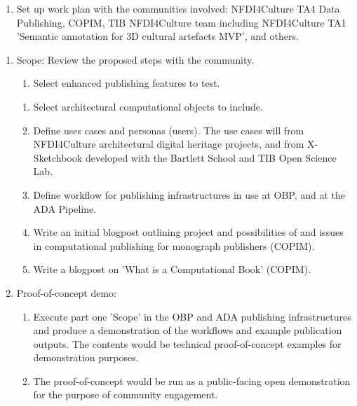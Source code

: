 \documentclass{article}
\begin{document}
\begin{enumerate}
\item Set up work plan with the communities involved: NFDI4Culture TA4 Data Publishing, COPIM, TIB NFDI4Culture team including NFDI4Culture TA1 'Semantic annotation for 3D cultural artefacts MVP', and others.


\end{enumerate}
\begin{enumerate}[start=2]
\item Scope: Review the proposed steps with the community.

\begin{enumerate}
\item Select enhanced publishing features to test.


\end{enumerate}
\begin{enumerate}[start=2]
\item Select architectural computational objects to include.


\item Define uses cases and personas (users). The use cases will from NFDI4Culture architectural digital heritage projects, and from X-Sketchbook developed with the Bartlett School and TIB Open Science Lab.   


\item Define workflow for publishing infrastructures in use at OBP, and at the ADA Pipeline.


\item Write an initial blogpost outlining project and possibilities of and issues in computational publishing for monograph publishers (COPIM).


\item Write a blogpost on 'What is a Computational Book' (COPIM).


\end{enumerate}

\item Proof-of-concept demo:

\begin{enumerate}
\item Execute part one 'Scope' in the OBP and ADA publishing infrastructures and produce a demonstration of the workflows and example publication outputs. The contents would be technical proof-of-concept examples for demonstration purposes. 


\item The proof-of-concept would be run as a public-facing open demonstration for the purpose of community engagement.



\end{enumerate}
\end{enumerate}
\end{document}
